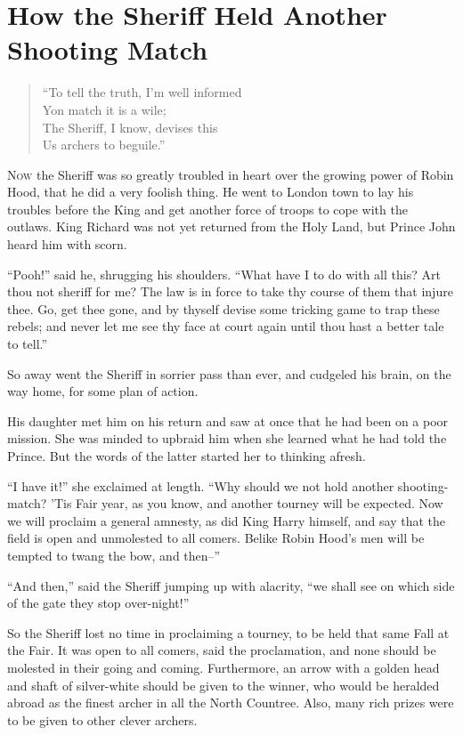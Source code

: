\chapter{How the Sheriff Held Another Shooting Match}

\begin{quote}
``To tell the truth, I'm well informed\\
Yon match it is a wile;\\
The Sheriff, I know, devises this\\
Us archers to beguile.''
\end{quote}

\lettrine{N}{ow} the Sheriff was so greatly troubled in heart over the
growing power of Robin Hood, that he did a very foolish thing. He went to
London town to lay his troubles before the King and get another force of
troops to cope with the outlaws. King Richard was not yet returned from
the Holy Land, but Prince John heard him with scorn.

``Pooh!'' said he, shrugging his shoulders. ``What have I to do with all
this? Art thou not sheriff for me? The law is in force to take thy
course of them that injure thee. Go, get thee gone, and by thyself
devise some tricking game to trap these rebels; and never let me see thy
face at court again until thou hast a better tale to tell.''

So away went the Sheriff in sorrier pass than ever, and cudgeled his
brain, on the way home, for some plan of action.

His daughter met him on his return and saw at once that he had been on a
poor mission. She was minded to upbraid him when she learned what he had
told the Prince. But the words of the latter started her to thinking
afresh.

``I have it!'' she exclaimed at length. ``Why should we not hold another
shooting-match? 'Tis Fair year, as you know, and another tourney will be
expected. Now we will proclaim a general amnesty, as did King Harry
himself, and say that the field is open and unmolested to all comers.
Belike Robin Hood's men will be tempted to twang the bow, and then--''

``And then,'' said the Sheriff jumping up with alacrity, ``we shall see
on which side of the gate they stop over-night!''

So the Sheriff lost no time in proclaiming a tourney, to be held that
same Fall at the Fair. It was open to all comers, said the proclamation,
and none should be molested in their going and coming. Furthermore, an
arrow with a golden head and shaft of silver-white should be given to
the winner, who would be heralded abroad as the finest archer in all the
North Countree. Also, many rich prizes were to be given to other clever
archers.

